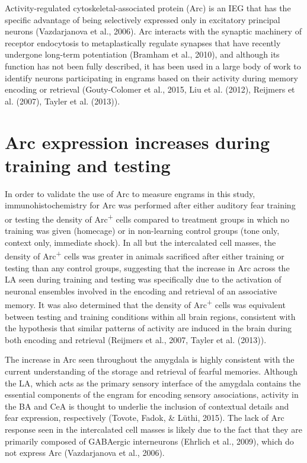 \documentclass[12pt,a4paperpaper,]{report}
\begin{document}
Activity-regulated cytoskeletal-associated protein (Arc) is an IEG that
has the specific advantage of being selectively expressed only in
excitatory principal neurons (Vazdarjanova et al., 2006). Arc interacts
with the synaptic machinery of receptor endocytosis to metaplastically
regulate synapses that have recently undergone long-term potentiation
(Bramham et al., 2010), and although its function has not been fully
described, it has been used in a large body of work to identify neurons
participating in engrams based on their activity during memory encoding
or retrieval (Gouty-Colomer et al., 2015, Liu et al. (2012), Reijmers et
al. (2007), Tayler et al. (2013)).

\section{Arc expression increases during training and
testing}\label{arc-expression-increases-during-training-and-testing}

In order to validate the use of Arc to measure engrams in this study,
immunohistochemistry for Arc was performed after either auditory fear
training or testing the density of Arc\textsuperscript{+} cells compared
to treatment groups in which no training was given (homecage) or in
non-learning control groups (tone only, context only, immediate shock).
In all but the intercalated cell masses, the density of
Arc\textsuperscript{+} cells was greater in animals sacrificed after
either training or testing than any control groups, suggesting that the
increase in Arc across the LA seen during training and testing was
specifically due to the activation of neuronal ensembles involved in the
encoding and retrieval of an associative memory. It was also determined
that the density of Arc\textsuperscript{+} cells was equivalent between
testing and training conditions within all brain regions, consistent
with the hypothesis that similar patterns of activity are induced in the
brain during both encoding and retrieval (Reijmers et al., 2007, Tayler
et al. (2013)).

The increase in Arc seen throughout the amygdala is highly consistent
with the current understanding of the storage and retrieval of fearful
memories. Although the LA, which acts as the primary sensory interface
of the amygdala contains the essential components of the engram for
encoding sensory associations, activity in the BA and CeA is thought to
underlie the inclusion of contextual details and fear expression,
respectively (Tovote, Fadok, \& Lüthi, 2015). The lack of Arc response
seen in the intercalated cell masses is likely due to the fact that they
are primarily composed of GABAergic interneurons (Ehrlich et al., 2009),
which do not express Arc (Vazdarjanova et al., 2006).
\end{document}
